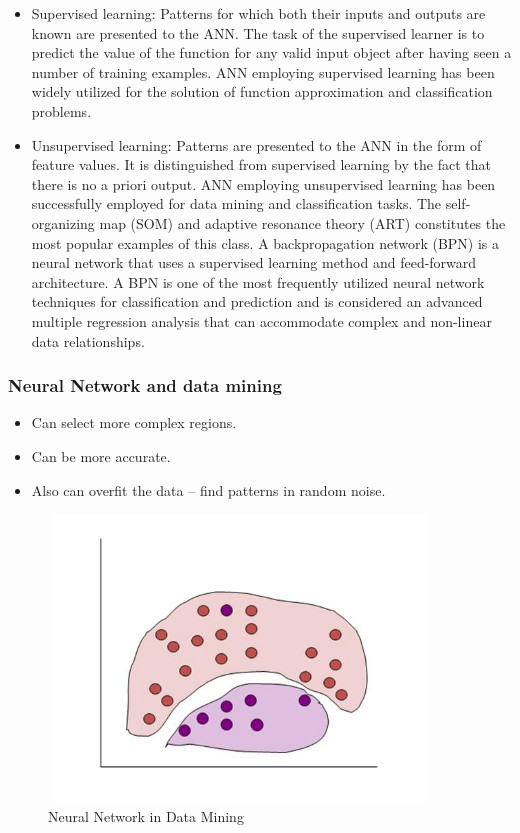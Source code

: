 \documentclass[a4paper,14pt,onecolumn]{article}
\begin{document}
\begin{itemize}

\item Supervised learning: Patterns for which both their inputs and outputs are known are presented to the ANN. The task of the supervised learner is to predict the value of the function for any valid input object after having seen a number of training examples. ANN employing supervised learning has been widely utilized for the solution of function approximation and classification problems.  

\item Unsupervised learning: Patterns are presented to the ANN in the form of feature values. It is distinguished from supervised learning by the fact that there is no a priori output. ANN employing unsupervised learning has been successfully employed for data mining and classification tasks. The self-organizing map (SOM) and adaptive resonance theory (ART) constitutes the most popular examples of this class. A backpropagation network (BPN) is a neural network that uses a supervised learning method and feed-forward architecture. A BPN is one of the most frequently utilized neural network techniques for classification and prediction and is considered an advanced multiple regression analysis that can accommodate complex and non-linear data relationships.
\end{itemize}

\subsubsection{Neural Network and data mining}
\begin{itemize}
\item Can select more complex regions.
\item Can be more accurate.
\item Also can overfit the data – find patterns in random noise.
\end{itemize}
\begin{figure}
\begin{center}
\includegraphics[height=3in,width=4in]
{NNdatamining.jpg}  
\caption{Neural Network in Data Mining}
\end{center}
\end{figure}
\end{document}
